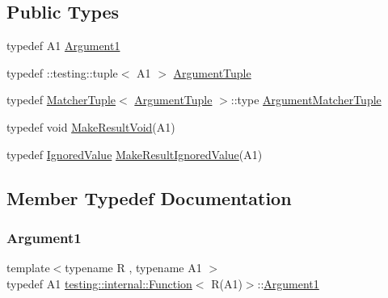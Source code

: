 \subsection*{Public Types}
\begin{DoxyCompactItemize}
\item 
typedef A1 \mbox{\hyperlink{structtesting_1_1internal_1_1_function_3_01_r_07_a1_08_4_aca36c8586218fd015cc4736dc8d4c14f}{Argument1}}
\item 
typedef \+::testing\+::tuple$<$ A1 $>$ \mbox{\hyperlink{structtesting_1_1internal_1_1_function_3_01_r_07_a1_08_4_afd48881a58d72658e547a170fb0f2087}{Argument\+Tuple}}
\item 
typedef \mbox{\hyperlink{structtesting_1_1internal_1_1_matcher_tuple}{Matcher\+Tuple}}$<$ \mbox{\hyperlink{structtesting_1_1internal_1_1_function_3_01_r_07_08_4_ad483c3128c470d8cdb55c3ac1c575c11}{Argument\+Tuple}} $>$\+::type \mbox{\hyperlink{structtesting_1_1internal_1_1_function_3_01_r_07_a1_08_4_a0e35671ae43c3d3310893e1d6d895d06}{Argument\+Matcher\+Tuple}}
\item 
typedef void \mbox{\hyperlink{structtesting_1_1internal_1_1_function_3_01_r_07_a1_08_4_aab10495172953eb51fc3940c4c1e890a}{Make\+Result\+Void}}(A1)
\item 
typedef \mbox{\hyperlink{classtesting_1_1internal_1_1_ignored_value}{Ignored\+Value}} \mbox{\hyperlink{structtesting_1_1internal_1_1_function_3_01_r_07_a1_08_4_a8fa56b9e05cb029ec7c8415ee352f865}{Make\+Result\+Ignored\+Value}}(A1)
\end{DoxyCompactItemize}


\subsection{Member Typedef Documentation}
\mbox{\label{structtesting_1_1internal_1_1_function_3_01_r_07_a1_08_4_aca36c8586218fd015cc4736dc8d4c14f}} 
\subsubsection{\texorpdfstring{Argument1}{Argument1}}
{\footnotesize\ttfamily template$<$typename R , typename A1 $>$ \\
typedef A1 \mbox{\hyperlink{structtesting_1_1internal_1_1_function}{testing\+::internal\+::\+Function}}$<$ R(A1)$>$\+::\mbox{\hyperlink{structtesting_1_1internal_1_1_function_3_01_r_07_a1_08_4_aca36c8586218fd015cc4736dc8d4c14f}{Argument1}}}

